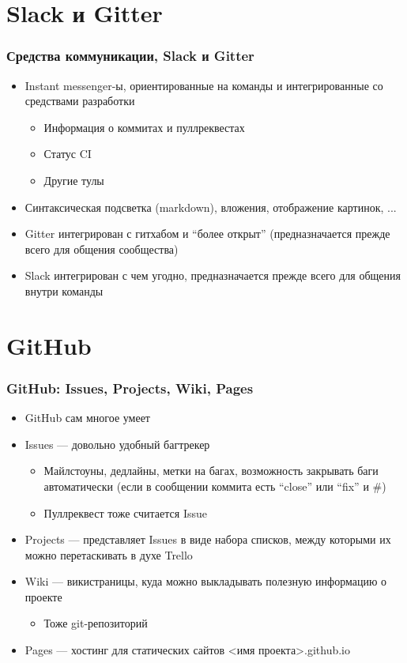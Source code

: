 \documentclass[xetex,mathserif,serif]{beamer}
\begin{document}
	\section{Slack и Gitter}

	\begin{frame}
		\frametitle{Средства коммуникации, Slack и Gitter}
		\begin{itemize}
			\item Instant messenger-ы, ориентированные на команды и интегрированные со средствами разработки
			\begin{itemize}
				\item Информация о коммитах и пуллреквестах
				\item Статус CI
				\item Другие тулы
			\end{itemize}
			\item Синтаксическая подсветка (markdown), вложения, отображение картинок, ...
			\item Gitter интегрирован с гитхабом и ``более открыт'' (предназначается прежде всего для общения сообщества)
			\item Slack интегрирован с чем угодно, предназначается прежде всего для общения внутри команды
		\end{itemize}
	\end{frame}

	\section{GitHub}

	\begin{frame}
		\frametitle{GitHub: Issues, Projects, Wiki, Pages}
		\begin{itemize}
			\item GitHub сам многое умеет
			\item Issues --- довольно удобный багтрекер
			\begin{itemize}
				\item Майлстоуны, дедлайны, метки на багах, возможность закрывать баги автоматически (если в сообщении коммита есть ``close'' или ``fix'' и \#<номер бага>)
				\item Пуллреквест тоже считается Issue
			\end{itemize}
			\item Projects --- представляет Issues в виде набора списков, между которыми их можно перетаскивать в духе Trello
			\item Wiki --- викистраницы, куда можно выкладывать полезную информацию о проекте
			\begin{itemize}
				\item Тоже git-репозиторий
			\end{itemize}
			\item Pages --- хостинг для статических сайтов <имя проекта>.github.io
		\end{itemize}
	\end{frame}
\end{document}
